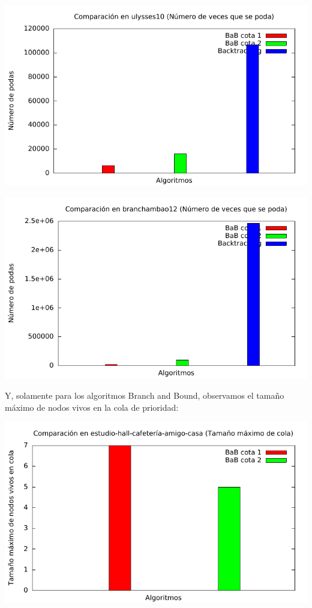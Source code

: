 \includegraphics[width=15cm]{img/barras_ulysses10_poda}

\includegraphics[width=15cm]{img/barras_branchambao12_poda}

Y, solamente para los algoritmos Branch and Bound, observamos el tamaño máximo de nodos vivos en la cola de prioridad:

\includegraphics[width=15cm]{img/barras_e-h-c-a-c5_cola}

